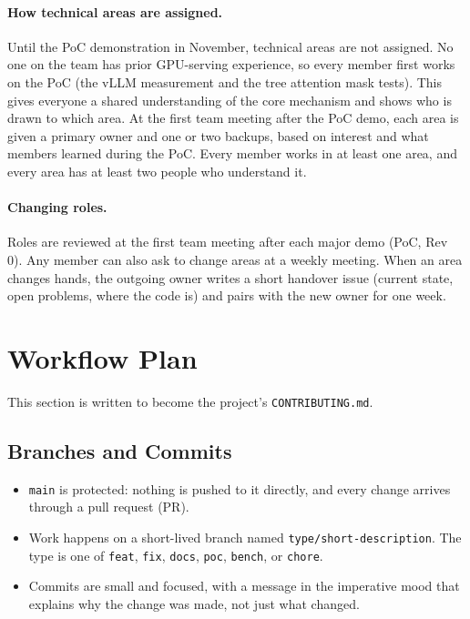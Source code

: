 \documentclass{article}
\begin{document}
\paragraph{How technical areas are assigned.} Until the PoC demonstration in
November, technical areas are not assigned. No one on the team has prior
GPU-serving experience, so every member first works on the PoC (the vLLM
measurement and the tree attention mask tests). This gives everyone a
shared understanding of the core mechanism and shows who is drawn to which
area. At the first team meeting after the PoC demo, each area is given a
primary owner and one or two backups, based on interest and what members
learned during the PoC. Every member works in at least one area, and every
area has at least two people who understand it.

\paragraph{Changing roles.} Roles are reviewed at the first team meeting
after each major demo (PoC, Rev 0). Any member can also ask to change areas
at a weekly meeting. When an area changes hands, the outgoing owner writes
a short handover issue (current state, open problems, where the code is)
and pairs with the new owner for one week.

\section{Workflow Plan}
\label{sec:workflow}

This section is written to become the project's \texttt{CONTRIBUTING.md}.

\subsection{Branches and Commits}

\begin{itemize}
  \item \texttt{main} is protected: nothing is pushed to it directly, and
  every change arrives through a pull request (PR).
  \item Work happens on a short-lived branch named
  \texttt{type/short-description}. The type is one of \texttt{feat},
  \texttt{fix}, \texttt{docs}, \texttt{poc}, \texttt{bench}, or
  \texttt{chore}.
  \item Commits are small and focused, with a message in the imperative
  mood that explains why the change was made, not just what changed.
\end{itemize}
\end{document}
